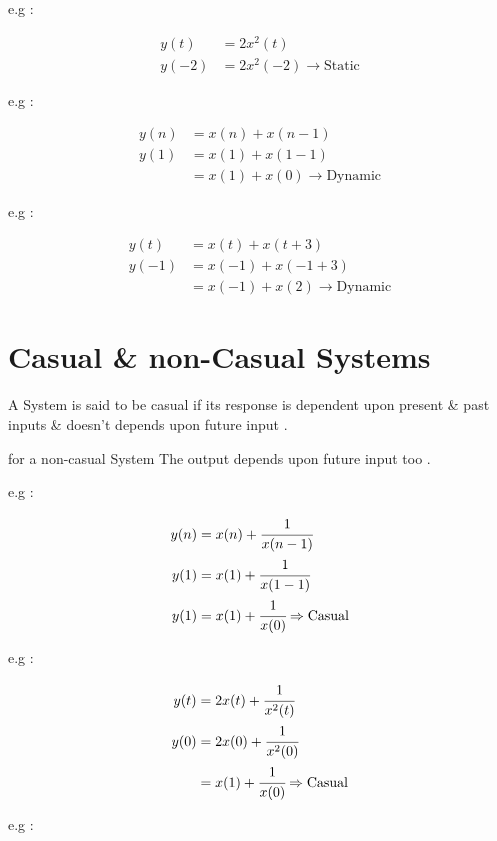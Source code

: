 \documentclass[12pt]{article}
\begin{document}
e.g : 

\begin{align*}
y(t) &= 2 x^{2}(t) \\ 
y(-2) &= 2 x^{2}(-2) \to \text{Static}
\end{align*}




e.g : 

\begin{align*}
y(n) &= x(n) + x(n-1) \\ 
y(1) &= x(1) + x(1-1) \\ 
&= x(1) + x(0) \to \text{Dynamic}
\end{align*}



e.g : 

\begin{align*}
y(t) &= x(t) + x(t+3) \\ 
y(-1) &= x(-1) + x(-1+3) \\ 
&= x(-1) + x(2) \to \text{Dynamic}
\end{align*}






\section{Casual \& non-Casual Systems}


A System is said to be casual if its response is dependent upon present \& past inputs \& doesn't depends upon future input .


for a non-casual System The output depends upon future input too .


\noindent 
e.g : 


\begin{align*}
y(n) &= x(n) + \cfrac{1}{x(n-1)} \\
y(1) &= x(1) + \cfrac{1}{x(1-1)} \\
y(1) &= x(1) + \cfrac{1}{x(0)} \Rightarrow \text{Casual}
\end{align*}


\noindent 
e.g : 

\begin{align*}
y(t) &= 2x(t) + \cfrac{1}{x^{2}(t)} \\
y(0) &= 2x(0) + \cfrac{1}{x^{2}(0)} \\
&= x(1) + \cfrac{1}{x(0)} \Rightarrow \text{Casual}
\end{align*}



\noindent 
e.g : 
\end{document}
